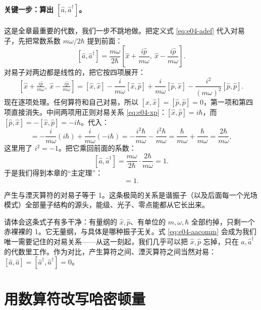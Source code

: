 \paragraph{关键一步：算出 \([\hat a,\hat a^\dagger]\)。}
这是全章最重要的代数，我们一步不跳地做。把定义式 \eqref{eq:e04-adef} 代入对易子，先把常数系数 \(m\omega/2\hbar\) 提到前面：
\[
  [\hat a,\hat a^\dagger]
  =\frac{m\omega}{2\hbar}
  \left[\hat x+\frac{i\hat p}{m\omega},\ \hat x-\frac{i\hat p}{m\omega}\right].
\]
对易子对两边都是线性的，把它按四项展开：
\[
  \left[\hat x+\tfrac{i\hat p}{m\omega},\ \hat x-\tfrac{i\hat p}{m\omega}\right]
  =[\hat x,\hat x]
  -\frac{i}{m\omega}[\hat x,\hat p]
  +\frac{i}{m\omega}[\hat p,\hat x]
  -\frac{i^2}{(m\omega)^2}[\hat p,\hat p].
\]
现在逐项处理。任何算符和自己对易，所以 \([\hat x,\hat x]=[\hat p,\hat p]=0\)，第一项和第四项直接消失。中间两项用正则对易关系 \eqref{eq:e04-xp}：\([\hat x,\hat p]=i\hbar\)，而 \([\hat p,\hat x]=-[\hat x,\hat p]=-i\hbar\)。代入：
\[
  =-\frac{i}{m\omega}(i\hbar)+\frac{i}{m\omega}(-i\hbar)
  =-\frac{i^2\hbar}{m\omega}-\frac{i^2\hbar}{m\omega}
  =\frac{\hbar}{m\omega}+\frac{\hbar}{m\omega}
  =\frac{2\hbar}{m\omega},
\]
这里用了 \(i^2=-1\)。把它乘回前面的系数：
\[
  [\hat a,\hat a^\dagger]=\frac{m\omega}{2\hbar}\cdot\frac{2\hbar}{m\omega}=1.
\]
于是我们得到本章的“主定理”：
\begin{equation}
  [\hat a,\hat a^\dagger]=1 .
  \label{eq:e04-aacomm}
\end{equation}
\begin{formulaexplain}
产生与湮灭算符的对易子等于 1。这条极简的关系是谐振子（以及后面每一个光场模式）全部量子结构的源头，能级、光子、零点能都从它长出来。
\end{formulaexplain}
请体会这条式子有多干净：有量纲的 \(\hat x,\hat p\)、有单位的 \(m,\omega,\hbar\) 全部约掉，只剩一个赤裸裸的 1。它无量纲，与具体是哪种振子无关。式 \eqref{eq:e04-aacomm} 会成为我们唯一需要记住的对易关系——从这一刻起，我们几乎可以把 \(\hat x,\hat p\) 忘掉，只在 \(\hat a,\hat a^\dagger\) 的代数里工作。作为对比，产生算符之间、湮灭算符之间当然对易：\([\hat a,\hat a]=[\hat a^\dagger,\hat a^\dagger]=0\)。

\section{用数算符改写哈密顿量}
\label{sec:e04-numberH}

